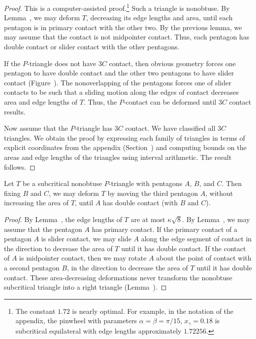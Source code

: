 \begin{proof} This is a computer-assisted proof.\footnote{The constant
    $1.72$ is nearly optimal.  For example, in the notation of the
    appendix, the pinwheel with parameters $\alpha=\beta=\pi/15$,
    $x_\gamma = 0.18$ is subcritical equilateral with edge lengths
    approximately $1.72256$.} Such a triangle is nonobtuse.  By
  Lemma~, we may deform $T$, decreasing its
  edge lengths and area, until each pentagon is in primary contact
  with the other two.  By the previous lemma, we may assume that the
  contact is not midpointer contact.  Thus, each pentagon has double
  contact or slider contact with the other pentagons.

  If the $P$-triangle does not have $3C$ contact, then obvious
  geometry forces one pentagon to have double contact and the other
  two pentagons to have slider contact (Figure~).
  The nonoverlapping of the pentagons forces one of slider contacts to
  be such that a sliding motion along the edges of contact decreases
  area and edge lengths of $T$.  Thus, the $P$-contact can be deformed
  until $3C$ contact results.



Now assume that the $P$-triangle has $3C$ contact.  We have classified
all $3C$ triangles.  We obtain the proof by expressing each family of
triangles in terms of explicit coordinates from the appendix
(Section~) and computing bounds on the areas and
edge lengths of the triangles using interval arithmetic.  The result
follows.
\end{proof}

\begin{lemma} 
  Let $T$ be a subcritical nonobtuse $P$-triangle with pentagons $A$,
  $B$, and $C$.  Then fixing $B$ and $C$, we may deform $T$ by moving
  the third pentagon $A$, without increasing the area of $T$, until
  $A$ has double contact (with $B$ and $C$).
\end{lemma}

\begin{proof}
  By Lemma~, the edge lengths of $T$ are at most
  $\kappa\sqrt8$.  By Lemma~, we may assume
  that the pentagon $A$ has primary contact.  If the primary contact
  of a pentagon $A$ is slider contact, we may slide $A$ along the edge segment
  of contact in the direction to decrease the area of $T$ until it has
  double contact.  If the contact of $A$ is midpointer contact, then
  we may rotate $A$ about the point of contact with a second pentagon
  $B$, in the direction to decrease the area of $T$ until it has
  double contact.  These area-decreasing deformations never transform
  the nonobtuse subcritical triangle into a right triangle
  (Lemma~).
\end{proof}


